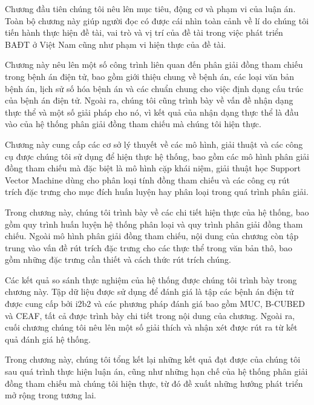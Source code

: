 \begin{description}[style=nextline,leftmargin=0cm]
\item[Chương 1: Tổng quan] Chương đầu tiên chúng tôi nêu lên mục tiêu, động cơ và phạm vi của luận án. Toàn bộ chương này giúp người đọc có được cái nhìn toàn cảnh về lí do chúng tôi tiến hành thực hiện đề tài, vai trò và vị trí của đề tài trong việc phát triển BAĐT ở Việt Nam cũng như phạm vi hiện thực của đề tài.
\item[Chương 2: Các công trình liên quan] Chương này nêu lên một số công trình liên quan đến phân giải đồng tham chiếu trong bệnh án điện tử, bao gồm giới thiệu chung về bệnh án, các loại văn bản bệnh án, lịch sử số hóa bệnh án và các chuẩn chung cho việc định dạng cấu trúc của bệnh án điện tử. Ngoài ra, chúng tôi cũng trình bày về vấn đề nhận dạng thực thể và một số giải pháp cho nó, vì kết quả của nhận dạng thực thể là đầu vào của hệ thống phân giải đồng tham chiếu mà chúng tôi hiện thực.
\item[Chương 3: Kiến thức nền tảng] Chương này cung cấp các cơ sở lý thuyết về các mô hình, giải thuật và các công cụ được chúng tôi sử dụng để hiện thực hệ thống, bao gồm các mô hình phân giải đồng tham chiếu mà đặc biệt là mô hình cặp khái niệm, giải thuật học Support Vector Machine dùng cho phân loại tính đồng tham chiếu và các công cụ rút trích đặc trưng cho mục đích huấn luyện hay phân loại trong quá trình phân giải.
\item[Chương 4: Hiện thực hệ thống] Trong chương này, chúng tôi trình bày về các chi tiết hiện thực của hệ thống, bao gồm quy trình huấn luyện hệ thống phân loại và quy trình phân giải đồng tham chiếu. Ngoài mô hình phân giải đồng tham chiếu, nội dung của chương còn tập trung vào vấn đề rút trích đặc trưng cho các thực thể trong văn bản thô, bao gồm những đặc trưng cần thiết và cách thức rút trích chúng.
\item[Chương 5: Thí nghiệm đánh giá] Các kết quả so sánh thực nghiệm của hệ thống được chúng tôi trình bày trong chương này. Tập dữ liệu được sử dụng để đánh giá là tập các bệnh án điện tử được cung cấp bởi i2b2 và các phương pháp đánh giá bao gồm MUC, B-CUBED và CEAF, tất cả được trình bày chi tiết trong nội dung của chương. Ngoài ra, cuối chương chúng tôi nêu lên một số giải thích và nhận xét được rút ra từ kết quả đánh giá hệ thống.
\item[Chương 6: Tổng kết] 
Trong chương này, chúng tôi tổng kết lại những kết quả đạt được của chúng tôi sau quá trình thực hiện luận án, cũng như những hạn chế của hệ thống phân giải đồng tham chiếu mà chúng tôi hiện thực, từ đó đề xuất những hướng phát triển mở rộng trong tương lai.
\end{description}
